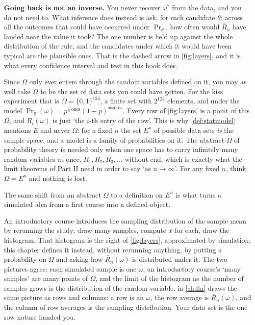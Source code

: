 \textbf{Going back is not an inverse.}
You never recover $\omega^*$ from the data, and you do not need to.
What inference does instead is ask, for each candidate $\theta$: across all the outcomes that could have occurred under $\Pr_\theta$, how often would $\bar{R}_n$ have landed near the value it took?
The one number is held up against the whole distribution of the rule, and the candidates under which it would have been typical are the plausible ones.
That is the dashed arrow in \cref{fig:layers}, and it is what every confidence interval and test in this book does.

\begin{intuition}
Since $\Omega$ only ever enters through the random variables defined on it, you may as well take $\Omega$ to be the set of data sets you could have gotten.
For the kiss experiment that is $\Omega = \{0,1\}^{124}$, a finite set with $2^{124}$ elements, and under the model $\Pr_p(\omega) = p^{\#\text{ones}}(1-p)^{\#\text{zeros}}$.
Every row of \cref{fig:layers} is a point of this $\Omega$, and $R_i(\omega)$ is just `the $i$-th entry of the row'.
This is why \cref{def:statmodel} mentions $E$ and never $\Omega$: for a fixed $n$ the set $E^n$ of possible data sets \textit{is} the sample space, and a model is a family of probabilities on it.
The abstract $\Omega$ of probability theory is needed only when one space has to carry infinitely many random variables at once, $R_1, R_2, R_3, \ldots$ without end, which is exactly what the limit theorems of Part II need in order to say `as $n \to \infty$'.
For any fixed $n$, think $\Omega = E^n$ and nothing is lost.
\end{intuition}

The same shift from an abstract $\Omega$ to a definition on $E^n$ is what turns a simulated idea from a first course into a defined object.

\begin{bridge}
An introductory course introduces the sampling distribution of the sample mean by rerunning the study: draw many samples, compute $\bar{x}$ for each, draw the histogram.
That histogram is the right of \cref{fig:layers}, approximated by simulation; this chapter defines it instead, without rerunning anything, by putting a probability on $\Omega$ and asking how $\bar{R}_n(\omega)$ is distributed under it.
The two pictures agree: each simulated sample is one $\omega$, an introductory course's `many samples' are many points of $\Omega$, and the limit of the histogram as the number of samples grows is the distribution of the random variable.
 in \cref{ch:lln} draws the same picture as rows and columns: a row is an $\omega$, the row average is $\bar{R}_n(\omega)$, and the column of row averages is the sampling distribution.
Your data set is the one row nature handed you.
\end{bridge}

